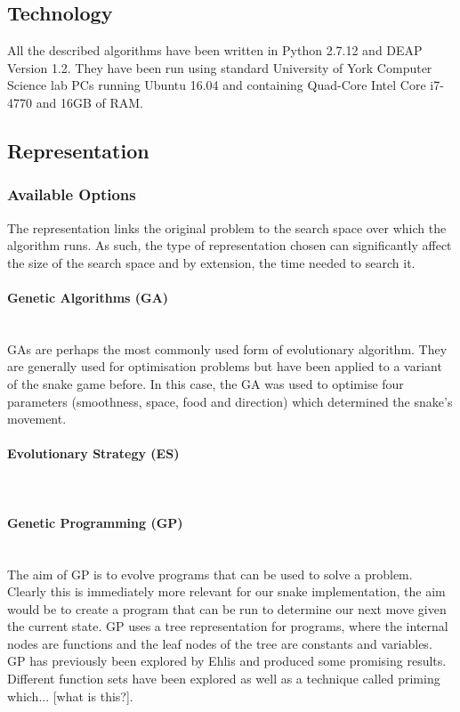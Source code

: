 \documentclass{article}
\newcommand{\myparagraph}[1]{\paragraph{#1}\mbox{}\\}
\begin{document}
\subsection{Technology}
All the described algorithms have been written in Python 2.7.12 and DEAP Version 1.2. They have been run using standard University of York Computer Science lab PCs running Ubuntu 16.04 and containing Quad-Core Intel Core i7-4770 and 16GB of RAM.

\subsection{Representation}
\subsubsection{Available Options}
The representation links the original problem to the search space over which the algorithm runs. As such, the type of representation chosen can significantly affect the size of the search space and by extension, the time needed to search it.


\myparagraph{Genetic Algorithms (GA)}
GAs are perhaps the most commonly used form of evolutionary algorithm. They are generally used for optimisation problems but have been applied to a variant of the snake game before\cite{snake_paper}. In this case, the GA was used to optimise four parameters (smoothness, space, food and direction) which determined the snake's movement.

\myparagraph{Evolutionary Strategy (ES)}


\myparagraph{Genetic Programming (GP)}
The aim of GP is to evolve programs that can be used to solve a problem. Clearly this is immediately more relevant for our snake implementation, the aim would be to create a program that can be run to determine our next move given the current state. GP uses a tree representation for programs, where the internal nodes are functions and the leaf nodes of the tree are constants and variables.
\\
GP has previously been explored by Ehlis\cite{snake_blog} and produced some promising results. Different function sets have been explored as well as a technique called priming which... [what is this?].
\end{document}
